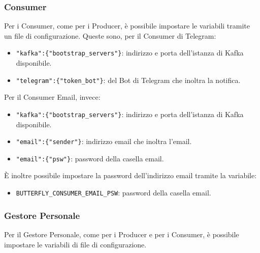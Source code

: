 	\subsubsection{Consumer}\label{var_consumer}
	Per i Consumer, come per i Producer, è possibile impostare le variabili tramite un file di configurazione.
	Queste sono, per il Consumer di Telegram:
	\begin{itemize}
		\item\texttt{"kafka":\{"bootstrap\_servers"\}}: indirizzo e porta dell'istanza di Kafka disponibile.
		\item\texttt{"telegram":\{"token\_bot"\}}:  del Bot di Telegram che inoltra la notifica.
	\end{itemize}

	Per il Consumer Email, invece:
	\begin{itemize}
		\item\texttt{"kafka":\{"bootstrap\_servers"\}}: indirizzo e porta dell'istanza di Kafka disponibile.
		\item\texttt{"email":\{"sender"\}}: indirizzo email che inoltra l'email.
		\item\texttt{"email":\{"psw"\}}: password della casella email.
	\end{itemize}

	È inoltre possibile impostare la password dell'indirizzo email tramite la variabile:
	\begin{itemize}
		\item\texttt{BUTTERFLY\_CONSUMER\_EMAIL\_PSW}: password della casella email.
	\end{itemize}

	\subsubsection{Gestore Personale}
	Per il Gestore Personale, come per i Producer e per i Consumer, è possibile impostare le variabili di file di configurazione. \par

